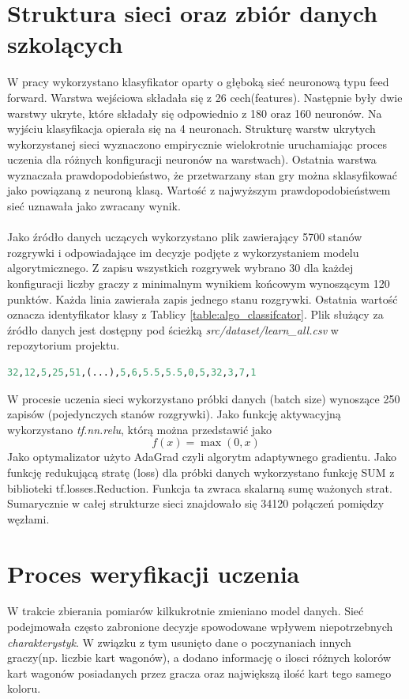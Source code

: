 \documentclass[12pt, oneside]{report}
\begin{document}
\section{Struktura sieci oraz zbiór danych szkolących}
\label{ch:learning_data}
W pracy wykorzystano klasyfikator oparty o głęboką sieć neuronową typu feed forward. Warstwa wejściowa składała się z 26 cech(features). Następnie były dwie warstwy ukryte, które składały się odpowiednio z 180 oraz 160 neuronów. Na wyjściu klasyfikacja opierała się na 4 neuronach. Strukturę warstw ukrytych wykorzystanej sieci wyznaczono empirycznie wielokrotnie uruchamiając proces uczenia dla różnych konfiguracji neuronów na warstwach). Ostatnia warstwa wyznaczała prawdopodobieństwo, że przetwarzany stan gry można sklasyfikować jako powiązaną z neuroną klasą. Wartość z najwyższym prawdopodobieństwem sieć uznawała jako zwracany wynik.
 \\ \\ 
Jako źródło danych uczących wykorzystano plik zawierający 5700 stanów rozgrywki i odpowiadające im decyzje podjęte z wykorzystaniem modelu algorytmicznego. Z zapisu wszystkich rozgrywek wybrano 30 dla każdej konfiguracji liczby graczy z minimalnym wynikiem końcowym wynoszącym 120 punktów. Każda linia zawierała zapis jednego stanu rozgrywki. Ostatnia wartość oznacza identyfikator klasy z Tablicy \ref{table:algo_classifcator}. Plik służący za źródło danych jest dostępny pod ścieżką \textit{src/dataset/learn\_all.csv} w repozytorium projektu. 
\begin{lstlisting}[frame=single, language=Python, caption=Pojedynczy format danych uczacych]
32,12,5,25,51,(...),5,6,5.5,5.5,0,5,32,3,7,1
\end{lstlisting}

W procesie uczenia sieci wykorzystano próbki danych (batch size) wynoszące 250 zapisów (pojedynczych stanów rozgrywki). Jako funkcję aktywacyjną wykorzystano \textit{tf.nn.relu}, którą można przedstawić jako 
\begin{equation}
	f(x) = \max (0,x)
	\label{eq:relu}
\end{equation}
Jako optymalizator użyto AdaGrad czyli algorytm adaptywnego gradientu. Jako funkcję redukującą stratę (loss) dla próbki danych wykorzystano funkcję SUM z biblioteki tf.losses.Reduction. Funkcja ta zwraca skalarną sumę ważonych strat. Sumarycznie w całej strukturze sieci znajdowało się 34120 połączeń pomiędzy węzłami.
\section{Proces weryfikacji uczenia}
W trakcie zbierania pomiarów kilkukrotnie zmieniano model danych. Sieć podejmowała często zabronione decyzje spowodowane wpływem niepotrzebnych \textit{charakterystyk}. W związku z tym usunięto dane o poczynaniach innych graczy(np. liczbie kart wagonów), a dodano informację o ilosci różnych kolorów kart wagonów posiadanych przez gracza oraz największą ilość kart tego samego koloru.
\end{document}
